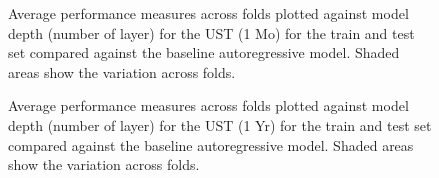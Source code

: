 \begin{figure}


\caption{\label{fig-ust-1-b}Average performance measures across folds plotted against model depth (number of layer) for the UST (1 Mo) for the train and test set compared against the baseline autoregressive model. Shaded areas show the variation across folds.}

\end{figure}%


\begin{figure}


\caption{\label{fig-ust-1y-b}Average performance measures across folds plotted against model depth (number of layer) for the UST (1 Yr) for the train and test set compared against the baseline autoregressive model. Shaded areas show the variation across folds.}

\end{figure}%

